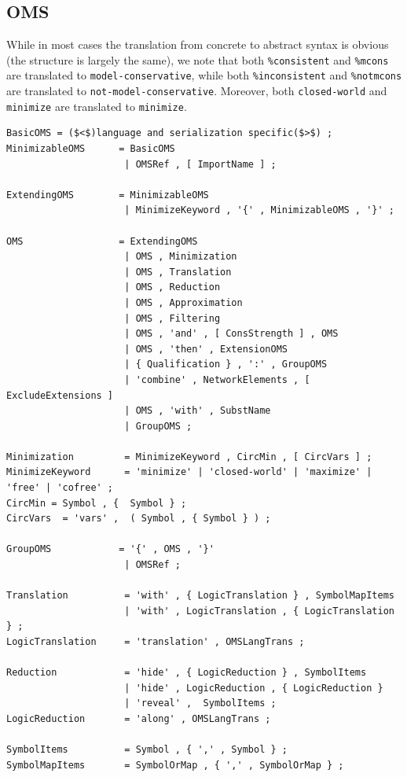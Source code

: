 \documentclass[10pt,fleqn,%
\ifpretendfinal
final%
\else
draft%
\fi,
]{scrreprt}
\newcommand*{\syntax}[1]{\texttt{#1}}
\newcommand{\ssclause}[1]{\subsection{#1}}
\begin{document}
\ssclause{OMS}\label{a:dol-text:OMS}

While in most cases the translation from concrete to abstract syntax
is obvious (the structure is largely the same), we note that both
\syntax{\%consistent} and \syntax{\%mcons} are translated to
\syntax{model-conservative}, while both \syntax{\%inconsistent} and
\syntax{\%notmcons} are translated to
\syntax{not-model-conservative}. Moreover, both \syntax{closed-world}
and \syntax{minimize} are translated to \syntax{minimize}.

                       
\begin{lstlisting}[language=ebnf,escapeinside={()},mathescape]
BasicOMS = ($<$)language and serialization specific($>$) ;
MinimizableOMS      = BasicOMS
                     | OMSRef , [ ImportName ] ; 
                     
ExtendingOMS        = MinimizableOMS
                     | MinimizeKeyword , '{' , MinimizableOMS , '}' ;
                     
OMS                 = ExtendingOMS
                     | OMS , Minimization 
                     | OMS , Translation
                     | OMS , Reduction
                     | OMS , Approximation
                     | OMS , Filtering
                     | OMS , 'and' , [ ConsStrength ] , OMS 
                     | OMS , 'then' , ExtensionOMS
                     | { Qualification } , ':' , GroupOMS
                     | 'combine' , NetworkElements , [ ExcludeExtensions ]  
                     | OMS , 'with' , SubstName
                     | GroupOMS ;

Minimization         = MinimizeKeyword , CircMin , [ CircVars ] ;
MinimizeKeyword      = 'minimize' | 'closed-world' | 'maximize' | 'free' | 'cofree' ;
CircMin = Symbol , {  Symbol } ;
CircVars  = 'vars' ,  ( Symbol , { Symbol } ) ;

GroupOMS            = '{' , OMS , '}'
                     | OMSRef ;

Translation          = 'with' , { LogicTranslation } , SymbolMapItems
                     | 'with' , LogicTranslation , { LogicTranslation } ;
LogicTranslation     = 'translation' , OMSLangTrans ;
                      
Reduction            = 'hide' , { LogicReduction } , SymbolItems 
                     | 'hide' , LogicReduction , { LogicReduction } 
                     | 'reveal' ,  SymbolItems ;
LogicReduction       = 'along' , OMSLangTrans ;

SymbolItems          = Symbol , { ',' , Symbol } ;
SymbolMapItems       = SymbolOrMap , { ',' , SymbolOrMap } ;


\end{lstlisting}
\end{document}
